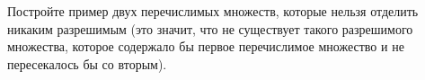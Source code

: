 Постройте пример двух перечислимых множеств, которые нельзя отделить никаким разрешимым (это значит, что
не существует такого разрешимого множества, которое содержало бы первое перечислимое множество и не
пересекалось бы со вторым).
